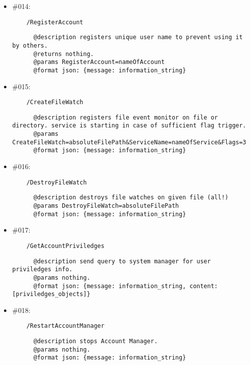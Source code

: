 \documentclass[11pt,a4paper]{scrartcl}
\begin{document}
\begin{itemize}
    \item \#014:
      \begin{verbatim}
    /RegisterAccount
      \end{verbatim}
      \begin{verbatim}
      @description registers unique user name to prevent using it by others.
      @returns nothing.
      @params RegisterAccount=nameOfAccount
      @format json: {message: information_string}
      \end{verbatim}

    \item \#015:
      \begin{verbatim}
    /CreateFileWatch
      \end{verbatim}
      \begin{verbatim}
      @description registers file event monitor on file or directory. service is starting in case of sufficient flag trigger.
      @params CreateFileWatch=absoluteFilePath&ServiceName=nameOfService&Flags=3
      @format json: {message: information_string}
      \end{verbatim}

    \item \#016:
      \begin{verbatim}
    /DestroyFileWatch
      \end{verbatim}
      \begin{verbatim}
      @description destroys file watches on given file (all!)
      @params DestroyFileWatch=absoluteFilePath
      @format json: {message: information_string}
      \end{verbatim}

    \item \#017:
      \begin{verbatim}
    /GetAccountPriviledges
      \end{verbatim}
      \begin{verbatim}
      @description send query to system manager for user priviledges info.
      @params nothing.
      @format json: {message: information_string, content: [priviledges_objects]}
      \end{verbatim}


    \item \#018:
      \begin{verbatim}
    /RestartAccountManager
      \end{verbatim}
      \begin{verbatim}
      @description stops Account Manager.
      @params nothing.
      @format json: {message: information_string}
      \end{verbatim}


\end{itemize}
\end{document}
